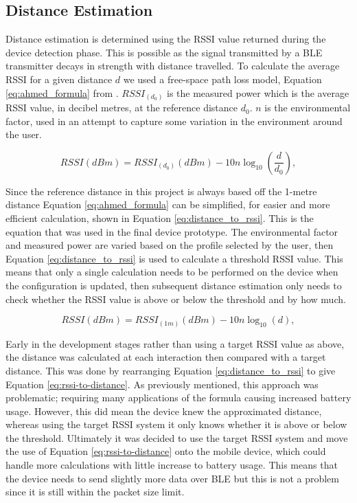 \documentclass{l4proj}
\begin{document}
\subsection{Distance Estimation}

Distance estimation is determined using the RSSI value returned during the device detection phase. This is possible as the signal transmitted by a BLE transmitter decays in strength with distance travelled. To calculate the average RSSI for a given distance $d$ we used a free-space path loss model, Equation \ref{eq:ahmed_formula} from \citep{ahmed_survey_2020}. ${RSSI}_{(d_0)}$ is the measured power which is the average RSSI value, in decibel metres, at the reference distance $d_0$. $n$ is the environmental factor, used in an attempt to capture some variation in the environment around the user.

\begin{equation}
    {RSSI(dBm)}={RSSI}_{(d_0)}{(dBm)}-10n\log_{10}{(\frac{d}{d_0})},
    \label{eq:ahmed_formula}
\end{equation}

Since the reference distance in this project is always based off the 1-metre distance Equation \ref{eq:ahmed_formula} can be simplified, for easier and more efficient calculation, shown in Equation \ref{eq:distance_to_rssi}. This is the equation that was used in the final device prototype. The environmental factor and measured power are varied based on the profile selected by the user, then Equation \ref{eq:distance_to_rssi} is used to calculate a threshold RSSI value. This means that only a single calculation needs to be performed on the device when the configuration is updated, then subsequent distance estimation only needs to check whether the RSSI value is above or below the threshold and by how much.

\begin{equation}
    {RSSI(dBm)}={{RSSI}_{(1m)}{(dBm)}} - 10n\log_{10}{(d)},
    \label{eq:distance_to_rssi}
\end{equation}

Early in the development stages rather than using a target RSSI value as above, the distance was calculated at each interaction then compared with a target distance. This was done by rearranging Equation \ref{eq:distance_to_rssi} to give Equation \ref{eq:rssi-to-distance}. As previously mentioned, this approach was problematic; requiring many applications of the formula causing increased battery usage. However, this did mean the device knew the approximated distance, whereas using the target RSSI system it only knows whether it is above or below the threshold. Ultimately it was decided to use the target RSSI system and move the use of Equation \ref{eq:rssi-to-distance} onto the mobile device, which could handle more calculations with little increase to battery usage. This means that the device needs to send slightly more data over BLE but this is not a problem since it is still within the packet size limit.
\end{document}
